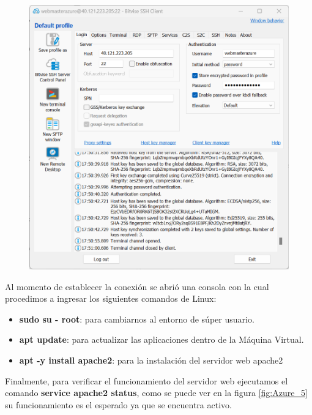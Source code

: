 \documentclass[12pt,a4paper]{article}
\begin{document}
\begin{figure}[H]
    \centering
    \includegraphics[width=1\linewidth]{M4_Servicios_Cómputo_en_la_Nube/Tarea_5_Creación_Máquinas_Virtuales_en_Nube/reporte/figuras/1_2_1_PHP_servidor_Web.png}
    \label{fig:Azure_4}
\end{figure}

Al momento de establecer la conexión se abrió una consola con la cual procedimos a ingresar los siguientes comandos de Linux:

\begin{itemize}
    \item \textbf{sudo su - root}: para cambiarnos al entorno de súper usuario.
    \item \textbf{apt update}: para actualizar las aplicaciones dentro de la Máquina Virtual.
    \item \textbf{apt -y install apache2}: para la instalación del servidor web apache2    
\end{itemize}

Finalmente, para verificar el funcionamiento del servidor web ejecutamos el comando \textbf{service apache2 status}, como se puede ver en la figura \ref{fig:Azure_5} su funcionamiento es el esperado ya que se encuentra activo.
\end{document}
